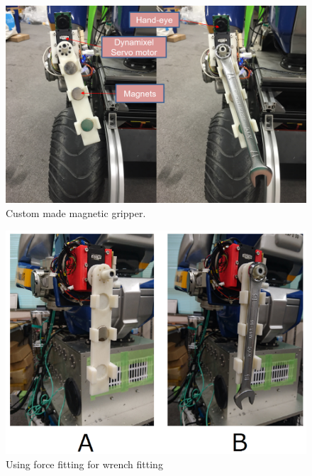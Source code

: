 \documentclass{standalone}
\begin{document}
\begin{figure}
  \includegraphics[width=\columnwidth]{sections/task2/images/gripper}
  \caption{Custom made magnetic gripper.}
  \label{fig:figure2}
\end{figure}


\begin{figure}
  \includegraphics[width=\columnwidth]{sections/task2/images/figure3}
  \caption{Using force fitting for wrench fitting}
  \label{fig:figure3}
\end{figure}
\end{document}
